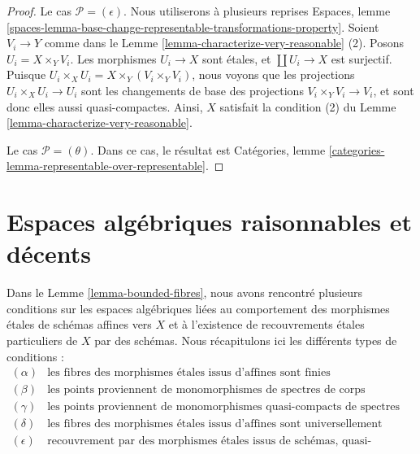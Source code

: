 \begin{proof}
\medskip\noindent
Le cas $\mathcal{P} = (\epsilon)$. Nous utiliserons à plusieurs reprises
Espaces, lemme
\ref{spaces-lemma-base-change-representable-transformations-property}.
Soient $V_i \to Y$ comme dans le
Lemme \ref{lemma-characterize-very-reasonable} (2).
Posons $U_i = X \times_Y V_i$. Les morphismes $U_i \to X$ sont étales,
et $\coprod U_i \to X$ est surjectif. Puisque
$U_i \times_X U_i = X \times_Y (V_i \times_Y V_i)$, nous voyons que les
projections $U_i \times_X U_i \to U_i$ sont les changements de base des
projections $V_i \times_Y V_i \to V_i$, et sont donc elles aussi
quasi-compactes. Ainsi, $X$ satisfait la condition (2) du
Lemme \ref{lemma-characterize-very-reasonable}.

\medskip\noindent
Le cas $\mathcal{P} = (\theta)$. Dans ce cas, le résultat est
Catégories, lemme \ref{categories-lemma-representable-over-representable}.
\end{proof}












\section{Espaces algébriques raisonnables et décents}
\label{section-reasonable-decent}

\noindent
Dans le
Lemme \ref{lemma-bounded-fibres},
nous avons rencontré plusieurs conditions sur les espaces algébriques liées
au comportement des morphismes étales de schémas affines vers $X$
et à l'existence de recouvrements étales particuliers de $X$ par des
schémas. Nous récapitulons ici les différents types de conditions :
$$
\boxed{
\begin{matrix}
(\alpha) & \text{les fibres des morphismes étales issus d'affines
sont finies} \\
(\beta) & \text{les points proviennent de monomorphismes
de spectres de corps} \\
(\gamma) & \text{les points proviennent de monomorphismes quasi-compacts de
spectres de corps} \\
(\delta) & \text{les fibres des morphismes étales issus d'affines sont
universellement bornées} \\
(\epsilon) & \text{recouvrement par des morphismes étales issus de schémas,
quasi-compacts sur leur image}
\end{matrix}
}
$$

